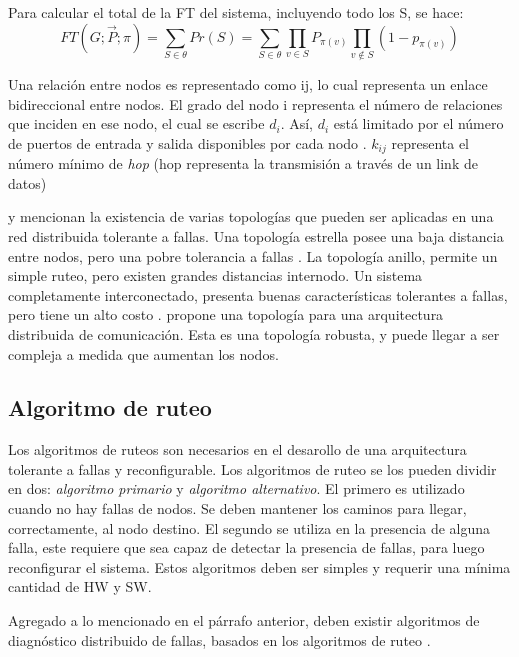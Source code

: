 Para calcular el total de la \ac{FT} del sistema, incluyendo todo los S, se hace: $$FT(G;\vec{P};\pi) = \sum_{S \in \theta}{Pr(S)} = \sum_{S \in \theta}{\prod_{v\in S}{P_{\pi (v)}} \prod_{v \notin S} (1-p_{\pi (v)})}$$

Una relación entre nodos es representado  como ij, lo cual representa un enlace bidireccional entre nodos. El grado del nodo i representa el número de relaciones que inciden en ese nodo, el cual se escribe $d_i$. Así, $d_i$ está limitado por el número de puertos de entrada y salida disponibles por cada nodo \citep{Pradhan82}. $k_{ij}$ representa el número mínimo de \textit{hop} (hop representa la transmisión a través de un link de datos) \citep{Pradhan82}

\cite{Stivaros92} y \cite{Pradhan82} mencionan la existencia de varias topologías que pueden ser aplicadas en una red distribuida tolerante a fallas. Una topología estrella posee una baja distancia entre nodos, pero una pobre tolerancia a fallas \citep{Pradhan82} \citep{Stivaros92}. La topología anillo, permite un simple ruteo, pero existen grandes distancias internodo. Un sistema completamente interconectado, presenta buenas características tolerantes a fallas, pero tiene un alto costo \citep{Pradhan82}. \cite{Pradhan82} propone una topología para una arquitectura distribuida de comunicación. Esta es una topología robusta, y puede llegar a ser compleja a medida que aumentan los nodos.

\subsection{Algoritmo de ruteo}
Los algoritmos de ruteos son necesarios en el desarollo de una arquitectura tolerante a fallas y reconfigurable. Los algoritmos de ruteo se los pueden dividir en dos: \textit{algoritmo primario} y \textit{algoritmo alternativo}. El primero es utilizado cuando no hay fallas de nodos. Se deben mantener los caminos para llegar, correctamente, al nodo destino. El segundo se utiliza en la presencia de alguna falla, este requiere que sea capaz de detectar la presencia de fallas, para luego reconfigurar el sistema. Estos algoritmos deben ser simples y requerir una mínima cantidad de \ac{HW} y \ac{SW}.

Agregado a lo mencionado en el párrafo anterior, deben existir algoritmos de diagnóstico distribuido de fallas, basados en los algoritmos de ruteo \citep{Pradhan82}.
